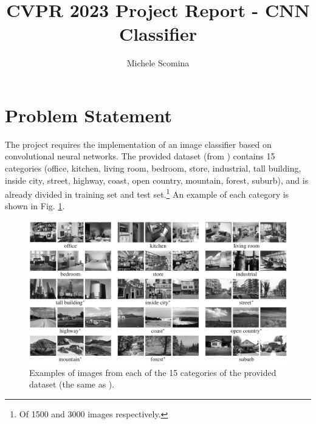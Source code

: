 \documentclass[a4paper, 11pt]{article}
\title{CVPR 2023 Project Report - CNN Classifier}
\author{Michele Scomina}
\begin{document}
\setlength{\parindent}{0pt}
\setlength{\parskip}{3pt}
\maketitle
\tableofcontents
{}

\pagebreak

\section{Problem Statement}
The project requires the implementation of an image classifier based on convolutional neural networks.
The provided dataset (from \cite{lazebnik2006beyond}) contains 15 categories (office, kitchen, living room,
bedroom, store, industrial, tall building, inside city, street, highway, coast, open country, mountain,
forest, suburb), and is already divided in training set and test set.\footnote{Of 1500 and 3000 images respectively.} An example of each category is
shown in Fig. \ref{fig:dataset_preview}.

\begin{figure}[h]
    \centering
    \includegraphics[width=1.0\textwidth]{dataset_preview.png}
    \caption{Examples of images from each of the 15 categories of the provided dataset (the same as \cite{lazebnik2006beyond}).}
    \label{fig:dataset_preview}
\end{figure}
\end{document}

